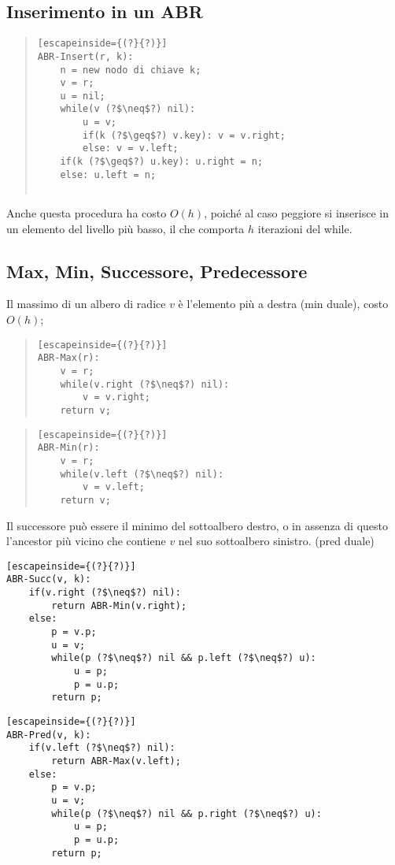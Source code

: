 \documentclass[a4paper,10pt]{article}
\theoremstyle{definition}
\begin{document}
\subsection{Inserimento in un ABR}
\begin{quote}
 \begin{lstlisting}[escapeinside={(?}{?)}]
ABR-Insert(r, k):
    n = new nodo di chiave k;
    v = r;
    u = nil;
    while(v (?$\neq$?) nil):
        u = v;
        if(k (?$\geq$?) v.key): v = v.right;
        else: v = v.left;
    if(k (?$\geq$?) u.key): u.right = n;
    else: u.left = n;
        
 \end{lstlisting}
\end{quote}
Anche questa procedura ha costo $O(h)$, poiché al caso peggiore si inserisce in un elemento del livello più basso, il che comporta $h$ iterazioni del while.
\subsection{Max, Min, Successore, Predecessore}
Il massimo di un albero di radice $v$ è l'elemento più a destra (min duale), costo $O(h)$;
\begin{multicols}{2}

\begin{quote}
 \begin{lstlisting}[escapeinside={(?}{?)}]
ABR-Max(r):
    v = r;
    while(v.right (?$\neq$?) nil):
        v = v.right;
    return v;
 \end{lstlisting}
\end{quote}
\begin{quote}
 \begin{lstlisting}[escapeinside={(?}{?)}]
ABR-Min(r):
    v = r;
    while(v.left (?$\neq$?) nil):
        v = v.left;
    return v;
 \end{lstlisting}
\end{quote}
\end{multicols}
Il successore può essere il minimo del sottoalbero destro, o in assenza di questo l'ancestor più vicino che contiene $v$ nel suo sottoalbero sinistro. (pred duale)
\begin{multicols}{2}
 
 \begin{lstlisting}[escapeinside={(?}{?)}]
ABR-Succ(v, k):
    if(v.right (?$\neq$?) nil):
        return ABR-Min(v.right);
    else:
        p = v.p;
        u = v;
        while(p (?$\neq$?) nil && p.left (?$\neq$?) u):
            u = p;
            p = u.p;
        return p;
 \end{lstlisting}

 \begin{lstlisting}[escapeinside={(?}{?)}]
ABR-Pred(v, k):
    if(v.left (?$\neq$?) nil):
        return ABR-Max(v.left);
    else:
        p = v.p;
        u = v;
        while(p (?$\neq$?) nil && p.right (?$\neq$?) u):
            u = p;
            p = u.p;
        return p;
 \end{lstlisting}

\end{multicols}
\end{document}
